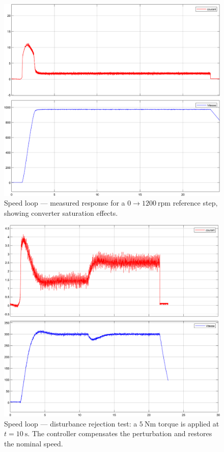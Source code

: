 \documentclass{rapportCS}
\begin{document}
\begin{figure}[H]
    \centering
    \includegraphics[width=\linewidth, keepaspectratio]{figures/p1200.png}
    \caption{Speed loop --- measured response for a $0 \rightarrow 1200~\text{rpm}$ reference step, showing converter saturation effects.}
    \label{fig:exp_W_1200}
\end{figure}

\begin{figure}[H]
    \centering
    \includegraphics[width=\linewidth, keepaspectratio]{figures/p300cr5.png}
    \caption{Speed loop --- disturbance rejection test: a $5~\text{Nm}$ torque is applied at $t=10~\text{s}$. 
    The controller compensates the perturbation and restores the nominal speed.}
    \label{fig:exp_W_disturbance}
\end{figure}
\end{document}
